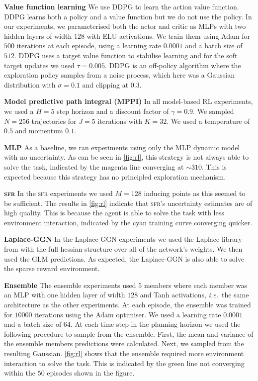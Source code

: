 \documentclass{article}
\makeatletter
\newcommand{\ie}{\textit{i.e.\@}\xspace}
\newcommand{\our}{\textsc{sfr}\xspace}
\makeatother
\begin{document}
\textbf{Value function learning}
We use DDPG to learn the action value function.
DDPG learns both a policy and a value function but we do not use the policy.
In our experiments, we parameterised both the actor and critic as MLPs with two hidden layers of width $128$ with ELU activations.
We train them using Adam for $500$ iterations at each episode, using a learning rate $0.0001$ and a batch size of $512$.
DDPG uses a target value function to stabilise learning and for the soft target updates
we used $\tau = 0.005$. 
DDPG is an off-policy algorithm where the exploration policy samples from a noise process, which here was a Gaussian distribution with $\sigma=0.1$ and clipping at $0.3$.

\textbf{Model predictive path integral (MPPI)}
In all model-based RL experiments, we used a $H=5$ step horizon and a discount factor of $\gamma=0.9$.
We sampled $N=256$ trajectories for $J=5$ iterations with $K=32$.
We used a temperature of $0.5$ and momentum $0.1$.



\textbf{MLP}
As a baseline, we ran experiments using only the MLP dynamic model with no uncertainty.
As can be seen in \cref{fig:rl}, this strategy is not always able to solve the task, indicated by the magenta line converging at $\sim 310$.
This is expected because this strategy has no principled exploration mechanism.


\textbf{\our}
In the \our experiments we used $M=128$ inducing points as this seemed to be sufficient.
The results in \cref{fig:rl} indicate that \our's uncertainty estimates are of high quality.
This is because the agent is able to solve the task with less environment interaction, indicated
by the cyan training curve converging quicker.

\textbf{Laplace-GGN}
In the Laplace-GGN experiments we used the Laplace library from \cite{daxberger2021laplace}
with the full hessian structure over all of the network's weights.
We then used the GLM predictions.
As expected, the Laplace-GGN is also able to solve the sparse reward environment.


\textbf{Ensemble}
The ensemble experiments used $5$ members where each member was an MLP with one hidden layer of width $128$ and Tanh activations, \ie\ the same architecture as the other experiments.
At each episode, the ensemble was trained for $10000$ iterations using the Adam optimiser.
We used a learning rate $0.0001$ and a batch size of $64$.
At each time step in the planning horizon we used the following procedure to sample from the ensemble.
First, the mean and variance of the ensemble members predictions were calculated.
Next, we sampled from the resulting Gaussian.
\cref{fig:rl} shows that the ensemble required more environment interaction to solve the task.
This is indicated by the green line not converging within the $50$ episodes shown in the figure.
\end{document}
